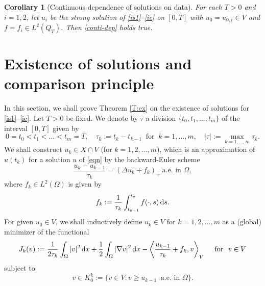 \documentclass[reqno,10pt]{amsart}
\newtheorem{Cor}[Th]{Corollary}
\begin{document}
\begin{Cor}[Continuous dependence of solutions on data]
 For each $T > 0$ and $i = 1,2$, let $u_i$ be the strong solution of
 \eqref{is1}--\eqref{ic} on $[0,T]$ with $u_0 = u_{0,i} \in V$ and $f =
 f_i \in L^2(Q_T)$. Then \eqref{conti-dep} holds true.
\end{Cor}

\section{Existence of solutions and comparison principle}\label{sec-td} 

In this section, we shall prove Theorem \ref{T:ex} on the existence of
solutions for \eqref{is1}--\eqref{ic}.
Let $T>0$ be fixed. We denote by $\tau$ a division
$\{t_0, t_1, \ldots, t_m \}$ of the interval $[0,T]$ given by
$$
0=t_0<t_1<\ldots <t_m=T,
\quad
\tau_k :=t_k-t_{k-1}
\ \mbox{ for } \ k=1,\ldots,m,
\quad |\tau|:=\max_{k=1,\ldots,m} \tau_k.
$$
We shall construct $u_k \in X \cap V$ (for $k = 1,2,\ldots,m$), which is
an approximation of $u(t_k)$ for a solution $u$ of \eqref{eqn} by the
backward-Euler scheme
\begin{equation}\label{star}
\dfrac{u_k-u_{k-1}}{\tau_k} = \left( \Delta u_k + f_k \right)_+ \ \mbox{
a.e.~in } \Omega,
\end{equation}
where $f_k\in L^2(\Omega)$ is given by
$$
f_k := \dfrac 1 {\tau_k} \int^{t_k}_{t_{k-1}} f(\cdot,s) \,{\text{\rm d}} s.
$$
For given $u_0\in V$, we shall inductively define $u_k \in V$ for $k =
1,2,\ldots, m$ as a (global) minimizer of the functional
\begin{equation}
J_k(v):=\frac{1}{2\tau_k}\int_\Omega |v|^2\,{\text{\rm d}} x
+\frac{1}{2}\int_\Omega |\nabla v|^2\,{\text{\rm d}} x
- \left\langle \dfrac{u_{k-1}}{\tau_k} + f_k ,v \right\rangle_V \label{Jk1}
\quad \mbox{ for } \ v \in V
\end{equation}
subject to
\begin{equation}
v \in K_0^k:=\{ v\in V \colon v \ge u_{k-1} \ \mbox{ a.e.~in } \Omega
 \}.\label{Jk2}
\end{equation}
\end{document}

